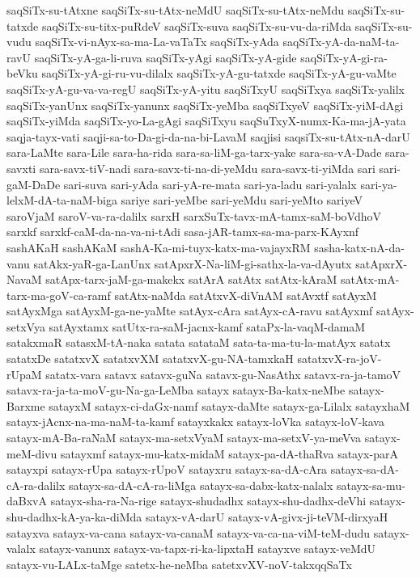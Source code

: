 {saqSiTx-su-tAtxne
saqSiTx-su-tAtx-neMdU
saqSiTx-su-tAtx-neMdu
saqSiTx-su-tatxde
saqSiTx-su-titx-puRdeV
saqSiTx-suva
saqSiTx-su-vu-da-riMda
saqSiTx-su-vudu
saqSiTx-vi-nAyx-sa-ma-La-vaTaTx
saqSiTx-yAda
saqSiTx-yA-da-naM-ta-ravU
saqSiTx-yA-ga-li-ruva
saqSiTx-yAgi
saqSiTx-yA-gide
saqSiTx-yA-gi-ra-beVku
saqSiTx-yA-gi-ru-vu-dilalx
saqSiTx-yA-gu-tatxde
saqSiTx-yA-gu-vaMte
saqSiTx-yA-gu-va-va-regU
saqSiTx-yA-yitu
saqSiTxyU
saqSiTxya
saqSiTx-yalilx
saqSiTx-yanUnx
saqSiTx-yanunx
saqSiTx-yeMba
saqSiTxyeV
saqSiTx-yiM-dAgi
saqSiTx-yiMda
saqSiTx-yo-La-gAgi
saqSiTxyu
saqSuTxyX-numx-Ka-ma-jA-yata
saqja-tayx-vati
saqji-sa-to-Da-gi-da-na-bi-LavaM
saqjisi
saqsiTx-su-tAtx-nA-darU
sara-LaMte
sara-Lile
sara-ha-rida
sara-sa-liM-ga-tarx-yake
sara-sa-vA-Dade
sara-savxti
sara-savx-tiV-nadi
sara-savx-ti-na-di-yeMdu
sara-savx-ti-yiMda
sari
sari-gaM-DaDe
sari-suva
sari-yAda
sari-yA-re-mata
sari-ya-ladu
sari-yalalx
sari-ya-lelxM-dA-ta-naM-biga
sariye
sari-yeMbe
sari-yeMdu
sari-yeMto
sariyeV
saroVjaM
saroV-va-ra-dalilx
sarxH
sarxSuTx-tavx-mA-tamx-saM-boVdhoV
sarxkf
sarxkf-caM-da-na-va-ni-tAdi
sasa-jAR-tamx-sa-ma-parx-KAyxnf
sashAKaH
sashAKaM
sashA-Ka-mi-tuyx-katx-ma-vajayxRM
sasha-katx-nA-da-vanu
satAkx-yaR-ga-LanUnx
satApxrX-Na-liM-gi-sathx-la-va-dAyutx
satApxrX-NavaM
satApx-tarx-jaM-ga-makekx
satArA
satAtx
satAtx-kAraM
satAtx-mA-tarx-ma-goV-ca-ramf
satAtx-naMda
satAtxvX-diVnAM
satAvxtf
satAyxM
satAyxMga
satAyxM-ga-ne-yaMte
satAyx-cAra
satAyx-cA-ravu
satAyxmf
satAyx-setxVya
satAyxtamx
satUtx-ra-saM-jacnx-kamf
sataPx-la-vaqM-damaM
satakxmaR
satasxM-tA-naka
satata
satataM
sata-ta-ma-tu-la-matAyx
satatx
satatxDe
satatxvX
satatxvXM
satatxvX-gu-NA-tamxkaH
satatxvX-ra-joV-rUpaM
satatx-vara
satavx
satavx-guNa
satavx-gu-NasAthx
satavx-ra-ja-tamoV
satavx-ra-ja-ta-moV-gu-Na-ga-LeMba
satayx
satayx-Ba-katx-neMbe
satayx-Barxme
satayxM
satayx-ci-daGx-namf
satayx-daMte
satayx-ga-Lilalx
satayxhaM
satayx-jAcnx-na-ma-naM-ta-kamf
satayxkakx
satayx-loVka
satayx-loV-kava
satayx-mA-Ba-raNaM
satayx-ma-setxVyaM
satayx-ma-setxV-ya-meVva
satayx-meM-divu
satayxmf
satayx-mu-katx-midaM
satayx-pa-dA-thaRva
satayx-parA
satayxpi
satayx-rUpa
satayx-rUpoV
satayxru
satayx-sa-dA-cAra
satayx-sa-dA-cA-ra-dalilx
satayx-sa-dA-cA-ra-liMga
satayx-sa-dabx-katx-nalalx
satayx-sa-mu-daBxvA
satayx-sha-ra-Na-rige
satayx-shudadhx
satayx-shu-dadhx-deVhi
satayx-shu-dadhx-kA-ya-ka-diMda
satayx-vA-darU
satayx-vA-givx-ji-teVM-dirxyaH
satayxva
satayx-va-cana
satayx-va-canaM
satayx-va-ca-na-viM-teM-dudu
satayx-valalx
satayx-vanunx
satayx-va-tapx-ri-ka-lipxtaH
satayxve
satayx-veMdU
satayx-vu-LALx-taMge
satetx-he-neMba
satetxvXV-noV-takxqqSaTx
}
